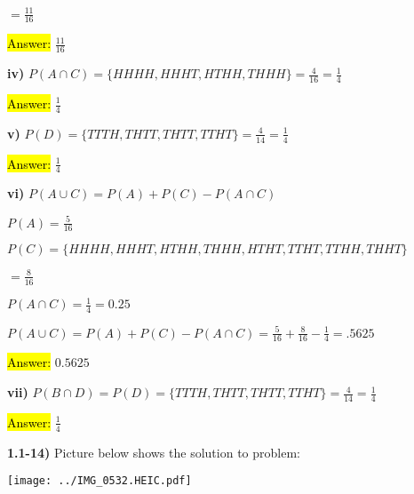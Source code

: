 \documentclass{article}
\begin{document}
\hspace{.58in}$=\frac{11}{16}$
\vspace{2mm}

\hl{Answer:} $\frac{11}{16}$


\vspace{3mm}

\textbf{iv)} $P(A\cap C)=\{HHHH,  HHHT, HTHH, THHH\}=\frac{4}{16}=\frac{1}{4}$
\vspace{2mm}

\hl{Answer:} $\frac{1}{4}$

\vspace{3mm}

\textbf{v)} $P(D)=\{TTTH, THTT,  THTT, TTHT\}=\frac{4}{14}=\frac{1}{4}$
\vspace{2mm}

\hl{Answer:} $\frac{1}{4}$


\vspace{3mm}


\textbf{vi)} $P(A\cup C)=P(A)+P(C)-P(A\cap C)$

\vspace{3mm}

$P(A)=\frac{5}{16}$

\vspace{2mm}

$P(C)=\{HHHH, HHHT,  HTHH, THHH, HTHT, TTHT, TTHH, THHT\}$

\hspace{.36in}$=\frac{8}{16}$

\vspace{2mm}

$P(A\cap C)=\frac{1}{4}=0.25$
\vspace{2mm}


$P(A\cup C)=P(A)+P(C)-P(A\cap C)=\frac{5}{16}+\frac{8}{16}-\frac{1}{4}=.5625$
\vspace{2mm}

\hl{Answer:} $0.5625$


\vspace{2mm}


\textbf{vii)} $P(B\cap D)=P(D)=\{TTTH, THTT,  THTT, TTHT\}=\frac{4}{14}=\frac{1}{4}$
\vspace{2mm}

\hl{Answer:} $\frac{1}{4}$



\newpage

\textbf{1.1-14)} Picture below shows the solution to problem:


\texttt{[image: ../IMG\_0532.HEIC.pdf]}
\end{document}
